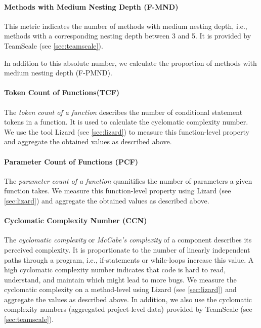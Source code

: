 \documentclass{scrartcl}
\begin{document}
\paragraph{Methods with Medium Nesting Depth (F-MND)}

This metric indicates the number of methods with medium nesting depth, i.e.,
methods with a corresponding nesting depth between 3 and 5. It is provided by
TeamScale (see \ref{sec:teamscale}).

In addition to this absolute number, we calculate the proportion of methods with
medium nesting depth (F-PMND).

\paragraph{Token Count of Functions(TCF)}

The \emph{token count of a function} describes the number of conditional
statement tokens in a function. It is used to calculate the cyclomatic
complexity number. We use the tool Lizard (see \ref{sec:lizard}) to measure this
function-level property and aggregate the obtained values as described above.

\paragraph{Parameter Count of Functions (PCF)}

The \emph{parameter count of a function} quanitifies the number of parameters a
given function takes. We measure this function-level property using Lizard (see
\ref{sec:lizard}) and aggregate the obtained values as described above.

\paragraph{Cyclomatic Complexity Number (CCN)}

The \emph{cyclomatic complexity} or \emph{McCabe's complexity} of a component
describes its perceived complexity. It is proportionate to the number of
linearly independent paths through a program, i.e., if-statements
or while-loops increase this value. A high cyclomatic complexity number
indicates that code is hard to read, understand, and maintain which might lead
to more bugs. We measure the cyclomatic complexity on a
method-level using Lizard (see \ref{sec:lizard}) and aggregate the values as
described above. In addition, we also use the cyclomatic complexity numbers
(aggregated project-level data) provided by TeamScale (see \ref{sec:teamscale}).
\end{document}
